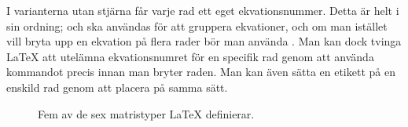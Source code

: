 \documentclass[../../a4.tex]{subfiles}
\begin{document}
I varianterna utan stjärna får varje rad ett eget ekvationsnummer. Detta
är helt i sin ordning;  och  ska användas för att
gruppera ekvationer, och om man istället vill bryta upp en ekvation på
flera rader bör man använda . Man kan dock tvinga \LaTeX{}
att utelämna ekvationsnumret för en specifik rad genom att använda
kommandot  precis innan man bryter raden. Man kan även
sätta en etikett på en enskild rad genom att placera  på samma
sätt.

\begin{figure}[b]
	\centering 
	\caption{Fem av de sex matristyper \AmS\LaTeX{} definierar.}
	\label{fig:matriser}
\end{figure}
\end{document}
